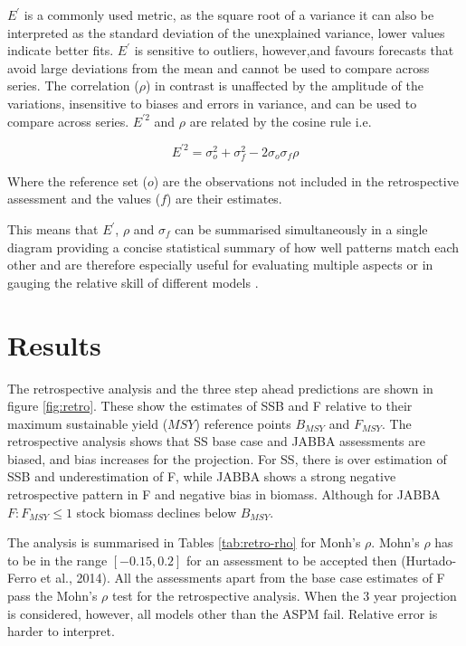 \documentclass[12pt,halfline,a4paper,nonumbib]{ouparticle}
\begin{document}
$E^\prime$ is a commonly used metric, as the square root of a variance it can also be interpreted as the standard deviation of the unexplained variance,  lower values indicate better fits. $E^\prime$ is sensitive to outliers, however,and favours forecasts that avoid large deviations from the mean and cannot be used to compare across series. The correlation ($\rho$) in contrast is unaffected by the amplitude of the variations, insensitive to biases and errors in variance, and can be used to compare across series. $E^{\prime 2}$ and $\rho$ are related by the cosine rule i.e.

 \begin{equation} 
 E^{\prime 2} = \sigma_o^2 + \sigma_f^2 - 2\sigma_o\sigma_f\rho
 \end{equation}

Where the reference set ($o$) are the observations not included in the retrospective assessment and the values ($f$) are their estimates. 
 
This means that $E^\prime$, $\rho$ and $\sigma_f$ can be summarised simultaneously in a single diagram\parencite{taylor2001summarizing} providing a concise statistical summary of how well patterns match each other and are therefore especially useful for evaluating multiple aspects or in gauging the relative skill of different models \parencite{griggs2002climate}.

\section{Results}

The retrospective analysis and the three step ahead predictions are shown in figure \ref{fig:retro}. These show the estimates of SSB and F relative to their maximum sustainable yield ($MSY$) reference points  $B_{MSY}$ and $F_{MSY}$. The retrospective analysis shows that SS base case and JABBA assessments are biased, and bias increases for the projection.  For SS, there is over estimation of SSB and underestimation of F, while JABBA shows a strong negative retrospective pattern in F and negative bias in biomass. Although for JABBA  $F:F_{MSY} \le 1$ stock biomass declines below $B_{MSY}$.

The analysis is summarised in Tables \ref{tab:retro-rho} for Monh's $\rho$. Mohn's $\rho$ has to be in the range $[-0.15,0.2]$ for an assessment to be accepted then (Hurtado-Ferro et al., 2014). All the assessments apart from the base case estimates of F pass the Mohn's $\rho$ test for the retrospective analysis. When the 3 year projection is considered, however, all models other than the ASPM fail. Relative error is harder to interpret. 
\end{document}
